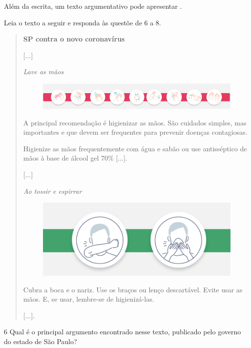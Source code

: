 \bigskip

\noindent{}Além da escrita, um texto argumentativo pode apresentar .

\bigskip

Leia o texto a seguir e responda às questõe de 6 a 8.

\begin{quote}
\textbf{SP contra o novo coronavírus}

{[}...{]}

\textit{Lave as mãos}

\begin{figure}[htpb!]
\includegraphics[width=\textwidth]{./imgs/img12ab.png}
\end{figure}

A principal recomendação é higienizar as mãos. São cuidados simples,
mas importantes e que devem ser frequentes para prevenir doenças
contagiosas.

Higienize as mãos frequentemente com água e sabão ou use antisséptico de
mãos à base de álcool gel 70\% {[}...{]}.

{[}...{]}

\begin{center}
\textit{Ao tossir e espirrar}
\end{center}

\begin{figure}[htpb!]
\centering
\includegraphics[width=.5\textwidth]{./imgs/img14.png}
\end{figure}

Cubra a boca e o nariz. Use os braços ou lenço descartável. Evite usar
as mãos. E, se usar, lembre-se de higienizá-las.

{[}...{]}.

\end{quote}

\num{6} Qual é o principal argumento encontrado nesse texto, publicado pelo governo do estado de São Paulo?

